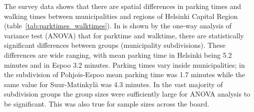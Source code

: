 The survey data shows that there are spatial differences in parking times and walking times between municipalities and regions of Helsinki Capital Region (table~\ref{tab:parktimes_walktimes}). In is shown by the one-way analysis of variance test (ANOVA) that for parktime and walktime, there are statistically significant differences between groups (municipality subdivisions). These differences are wide ranging, with mean parking time in Helsinki being 5.2 minutes and in Espoo 3.2 minutes. Parking times vary inside municipalities; in the subdivision of Pohjois-Espoo mean parking time was 1.7 minutes while the same value for Suur-Matinkylä was 4.3 minutes. In the vast majority of subdivision groups the group sizes were sufficiently large for ANOVA analysis to be significant. This was also true for sample sizes across the board.





